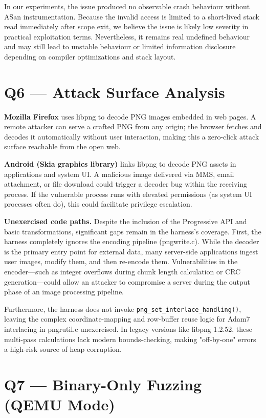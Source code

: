 \documentclass[letterpaper,twocolumn,10pt]{article}
\begin{document}
In our experiments, the issue produced no observable crash behaviour without ASan instrumentation. Because the invalid access is limited to a short-lived stack read immediately after scope exit, we believe the issue is likely low severity in practical exploitation terms. Nevertheless, it remains real undefined behaviour and may still lead to unstable behaviour or limited information disclosure depending on compiler optimizations and stack layout.


\section{Q6 --- Attack Surface Analysis}
\label{sec:q6}

\textbf{Mozilla Firefox} uses libpng to decode PNG images embedded
in web pages. A remote attacker can serve a crafted PNG from any
origin; the browser fetches and decodes it automatically without user
interaction, making this a zero-click attack surface reachable from
the open web.

\textbf{Android (Skia graphics library)} links libpng to decode PNG
assets in applications and system UI. A malicious image delivered via
MMS, email attachment, or file download could trigger a decoder bug
within the receiving process. If the vulnerable process runs with
elevated permissions (as system UI processes often do), this could
facilitate privilege escalation.

\textbf{Unexercised code paths.} 
Despite the inclusion of the Progressive API and basic transformations, significant gaps remain in the harness's coverage. First, the harness completely ignores the encoding pipeline (pngwrite.c). While the decoder is the primary entry point for external data, many server-side applications ingest user images, modify them, and then re-encode them. Vulnerabilities in the encoder—such as integer overflows during chunk length calculation or CRC generation—could allow an attacker to compromise a server during the output phase of an image processing pipeline.

Furthermore, the harness does not invoke \texttt{png\_set\_interlace\_handling()}, leaving the complex coordinate-mapping and row-buffer reuse logic for Adam7 interlacing in pngrutil.c unexercised. In legacy versions like libpng 1.2.52, these multi-pass calculations lack modern bounds-checking, making "off-by-one" errors a high-risk source of heap corruption.

\section{Q7 --- Binary-Only Fuzzing (QEMU Mode)}
\label{sec:q7}
\end{document}
